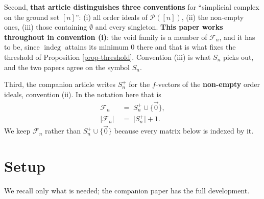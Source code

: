 \documentclass[11pt, a4paper, abstract=yes]{scrartcl}
\theoremstyle{definition}
\theoremstyle{remark}
\theoremstyle{plain}
\newcommand{\indeg}{\operatorname{indeg}}
\begin{document}
Second, \textbf{that article distinguishes three conventions} for ``simplicial complex on the ground set
\([n]\)'': (i) all order ideals of \(\mathcal P([n])\), (ii) the non-empty ones, (iii) those containing
\(\emptyset\) and every singleton. \textbf{This paper works throughout in convention (i)}: the void family
is a member of \(\mathcal F_n\), and it has to be, since \(\indeg\) attains its minimum \(0\) there and
that is what fixes the threshold of Proposition \ref{prop-threshold}. Convention (iii) is what \(S_n\)
picks out, and the two papers agree on the symbol \(S_n\).

Third, the companion article writes \(S_n^{+}\) for the \(f\)-vectors of the \textbf{non-empty} order
ideals, convention (ii). In the notation here that is
\begin{align}
  \mathcal F_n &\;=\; S_n^{+}\cup\lbrace\vec 0\rbrace,\label{eq:Fn-vs-Splus}\\
  \lvert\mathcal F_n\rvert &\;=\; \lvert S_n^{+}\rvert+1 .\label{eq:Fn-vs-Splus-card}
\end{align}
We keep \(\mathcal F_n\) rather than \(S_n^{+}\cup\lbrace\vec0\rbrace\) because every matrix below is
indexed by it.
\section{Setup}
\label{sec-setup}
We recall only what is needed; the companion paper has the full development.
\end{document}
